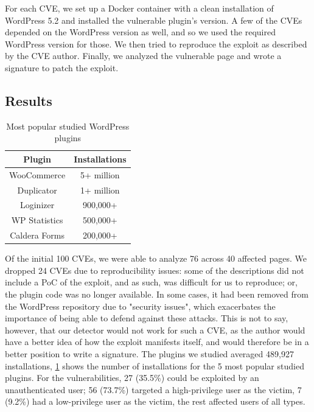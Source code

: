 For each CVE, we set up a Docker container with a clean installation of WordPress 5.2 and installed the vulnerable plugin's version. A few of the CVEs depended on the WordPress version as well, and so we used the required WordPress version for those. We then tried to reproduce the exploit as described by the CVE author. Finally, we analyzed the vulnerable page and wrote a signature to patch the exploit.

\subsection{Results}

\begin{table}[h!]
	\begin{center}
		\begin{tabular}{|c c|} 
			\hline
			Plugin & Installations\\ [1ex] 
			\hline
			WooCommerce  & 5+ million  \\  
			Duplicator & 1+ million \\  
			Loginizer & 900,000+ \\  
			WP Statistics & 500,000+ \\  
			Caldera Forms & 200,000+ \\   
			\hline
		\end{tabular}
		\caption{Most popular studied WordPress plugins}
		\label{table:1}
	\end{center}
\end{table}

Of the initial 100 CVEs, we were able to analyze 76 across 40 affected pages. We dropped 24 CVEs due to reproducibility issues: some of the descriptions did not include a PoC of the exploit, and as such, was difficult for us to reproduce; or, the plugin code was no longer available. In some cases, it had been removed from the WordPress repository due to "security issues", which exacerbates the importance of being able to defend against these attacks. This is not to say, however, that our detector would not work for such a CVE, as the author would have a better idea of how the exploit manifests itself, and would therefore be in a better position to write a signature. The plugins we studied averaged 489,927 installations, \ref{table:1} shows the number of installations for the 5 most popular studied plugins. For the vulnerabilities, 27 (35.5\%) could be exploited by an unauthenticated user; 56 (73.7\%) targeted a high-privilege user as the victim, 7 (9.2\%) had a low-privilege user as the victim, the rest affected users of all types.

